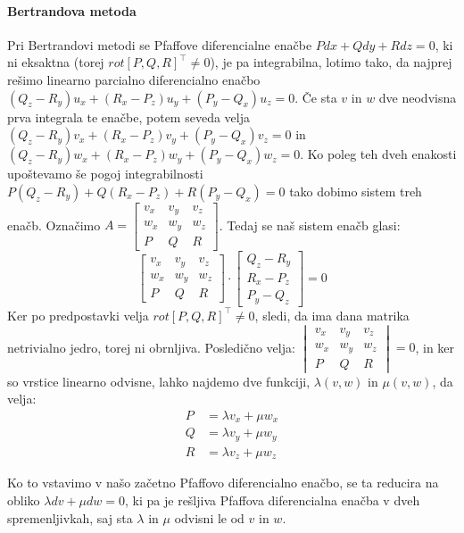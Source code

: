 \documentclass[a4paper, 10pt]{article}
\begin{document}
					\paragraph{Bertrandova metoda}
						Pri Bertrandovi metodi se Pfaffove diferencialne enačbe $Pdx + Qdy + Rdz = 0$, ki ni eksaktna (torej $rot[P, Q, R]^\top \neq 0$), je pa integrabilna, lotimo tako, da najprej rešimo linearno parcialno diferencialno enačbo $(Q_z - R_y)u_x + (R_x - P_z)u_y + (P_y - Q_x)u_z = 0$. Če sta $v$ in $w$ dve neodvisna prva integrala te enačbe, potem seveda velja $(Q_z - R_y)v_x + (R_x - P_z)v_y + (P_y - Q_x)v_z = 0$ in $(Q_z - R_y)w_x + (R_x - P_z)w_y + (P_y - Q_x)w_z = 0$. Ko poleg teh dveh enakosti upoštevamo še pogoj integrabilnosti $P(Q_z - R_y) + Q(R_x - P_z) + R(P_y - Q_x) = 0$ tako dobimo sistem treh enačb. Označimo $A = \begin{bmatrix}
							v_x & v_y & v_z \\
							w_x & w_y & w_z \\
							P & Q & R
						\end{bmatrix}$. Tedaj se naš sistem enačb glasi: $$\begin{bmatrix}
							v_x & v_y & v_z \\
							w_x & w_y & w_z \\
							P & Q & R
						\end{bmatrix} \cdot \begin{bmatrix}
						Q_z - R_y \\
						R_x - P_z \\
						P_y - Q_z
						\end{bmatrix} = 0$$ Ker po predpostavki velja $rot[P, Q, R]^\top \neq 0$, sledi, da ima dana matrika netrivialno jedro, torej ni obrnljiva. Posledično velja: $\begin{vmatrix}
							v_x & v_y & v_z \\
							w_x & w_y & w_z \\
							P & Q & R
						\end{vmatrix} = 0$, in ker so vrstice linearno odvisne, lahko najdemo dve funkciji, $\lambda(v, w)$ in $\mu(v, w)$, da velja: \begin{align*}
						P &= \lambda v_x + \mu w_x \\
						Q &= \lambda v_y + \mu w_y \\
						R &= \lambda v_z + \mu w_z
						\end{align*}
						
						Ko to vstavimo v našo začetno Pfaffovo diferencialno enačbo, se ta reducira na obliko $\lambda dv + \mu dw = 0$, ki pa je rešljiva Pfaffova diferencialna enačba v dveh spremenljivkah, saj sta $\lambda$ in $\mu$ odvisni le od $v$ in $w$.
						
\end{document}
